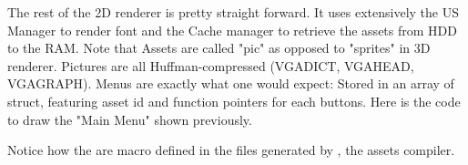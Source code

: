 \par
The rest of the 2D renderer is pretty straight forward. It uses extensively the US Manager to render font and the Cache manager to retrieve the assets from HDD to the RAM. Note that Assets are called "pic" as opposed to "sprites" in 3D renderer. Pictures are all Huffman-compressed (VGADICT, VGAHEAD, VGAGRAPH). Menus are exactly what one would expect: Stored in an array of struct, featuring asset id and function pointers for each buttons. Here is the code to draw the "Main Menu" shown previously.\\

\par
\begin{minipage}{\textwidth}

\end{minipage}

\par
\begin{minipage}{\textwidth}

\end{minipage}
\par
Notice how the  are macro defined in the files generated by , the assets compiler.

